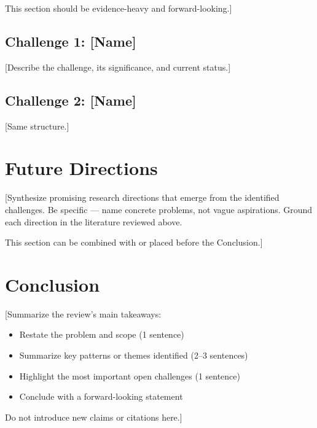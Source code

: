 \documentclass[11pt,a4paper]{article}
\begin{document}
This section should be evidence-heavy and forward-looking.]

\subsection{Challenge 1: [Name]}
[Describe the challenge, its significance, and current status.]

\subsection{Challenge 2: [Name]}
[Same structure.]

\section{Future Directions}
[Synthesize promising research directions that emerge from the identified
challenges. Be specific — name concrete problems, not vague aspirations.
Ground each direction in the literature reviewed above.

This section can be combined with or placed before the Conclusion.]

\section{Conclusion}
[Summarize the review's main takeaways:
\begin{itemize}
    \item Restate the problem and scope (1 sentence)
    \item Summarize key patterns or themes identified (2–3 sentences)
    \item Highlight the most important open challenges (1 sentence)
    \item Conclude with a forward-looking statement
\end{itemize}

Do not introduce new claims or citations here.]
\end{document}
